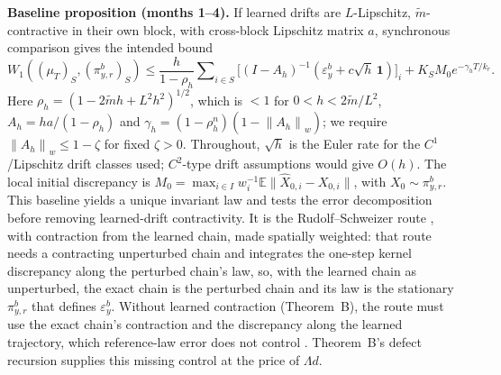 \documentclass[12pt,a4paper]{article}
\newcommand{\E}{\mathbb E}
\newcommand{\W}{W_1}
\newcommand{\pir}{\pi_{y,r}^{b}}
\newcommand{\epsb}{\varepsilon^{b}_{y}}
\newcommand{\normw}[1]{\left\|#1\right\|_w}
\begin{document}
\textbf{Baseline proposition (months 1--4).} If learned drifts are $L$-Lipschitz, $\widetilde m$-contractive in their own block, with cross-block Lipschitz matrix $a$, synchronous comparison gives the intended bound
\begin{equation}\label{eq:baseline}
 \W((\mu_T)_S,(\pir)_S)
 \leq\frac{h}{1-\rho_h}\sum\nolimits_{i\in S}\bigl[(I-A_h)^{-1}
 (\epsb+c\sqrt h\,\mathbf1)\bigr]_i
 +K_SM_0e^{-\gamma_h T/k_r}.
\end{equation}
Here $\rho_h=(1-2\widetilde mh+L^2h^2)^{1/2}$, which is $<1$ for $0<h<2\widetilde m/L^2$, $A_h=ha/(1-\rho_h)$ and $\gamma_h=(1-\rho_h^n)(1-\normw{A_h})$; we require $\normw{A_h}\leq1-\zeta$ for fixed $\zeta>0$. Throughout, $\sqrt h$ is the Euler rate for the $C^1$/Lipschitz drift classes used; $C^2$-type drift assumptions would give $O(h)$. The local initial discrepancy is $M_0=\max_{i\in I}w_i^{-1}\E\|\widehat X_{0,i}-X_{0,i}\|$, with $X_0\sim\pir$. This baseline yields a unique invariant law and tests the error decomposition before removing learned-drift contractivity. It is the Rudolf--Schweizer route \cite{RS18}, with contraction from the learned chain, made spatially weighted: that route needs a contracting unperturbed chain and integrates the one-step kernel discrepancy along the perturbed chain's law, so, with the learned chain as unperturbed, the exact chain is the perturbed chain and its law is the stationary $\pir$ that defines $\epsb$. Without learned contraction (Theorem~B), the route must use the exact chain's contraction and the discrepancy along the learned trajectory, which reference-law error does not control \cite{CCSW26}. Theorem~B's defect recursion supplies this missing control at the price of $\Lambda d$.
\end{document}
